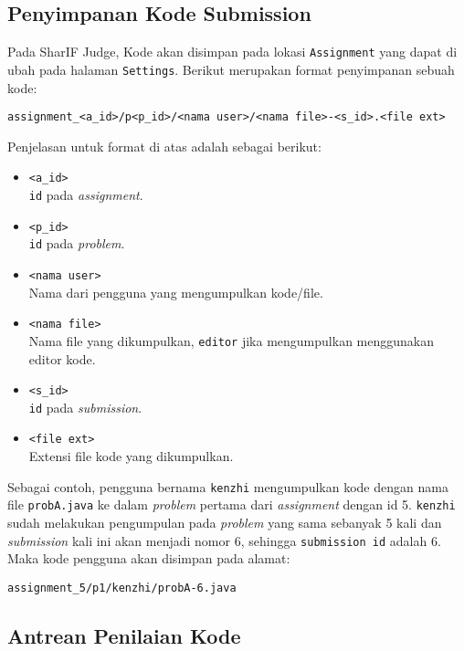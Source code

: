 \subsection{Penyimpanan Kode Submission}
\label{sub:3:1:penyimpanankode}
Pada SharIF Judge, Kode akan disimpan pada lokasi \verb|Assignment| yang dapat di ubah pada halaman \verb|Settings|. Berikut merupakan format penyimpanan sebuah kode:

\begin{center}
	\verb|assignment_<a_id>/p<p_id>/<nama user>/<nama file>-<s_id>.<file ext>|
\end{center}

Penjelasan untuk format di atas adalah sebagai berikut:

\begin{itemize}
	\item \verb|<a_id>| \\
	      \verb|id| pada \textit{assignment}.
	\item \verb|<p_id>| \\
	      \verb|id| pada \textit{problem}.
	\item \verb|<nama user>| \\
	      Nama dari pengguna yang mengumpulkan kode/file.
	\item \verb|<nama file>| \\
	      Nama file yang dikumpulkan, \verb|editor| jika mengumpulkan menggunakan editor kode.
	\item \verb|<s_id>| \\
	      \verb|id| pada \textit{submission}.
	\item \verb|<file ext>| \\
	      Extensi file kode yang dikumpulkan.
\end{itemize}

Sebagai contoh, pengguna bernama \verb|kenzhi| mengumpulkan kode dengan nama file \verb|probA.java| ke dalam \textit{problem} pertama dari \textit{assignment} dengan id 5. \verb|kenzhi| sudah melakukan pengumpulan pada \textit{problem} yang sama sebanyak 5 kali dan \textit{submission} kali ini akan menjadi nomor 6, sehingga \verb|submission id| adalah 6. Maka kode pengguna akan disimpan pada alamat:

\begin{center}
	\verb|assignment_5/p1/kenzhi/probA-6.java|
\end{center}

\subsection{Antrean Penilaian Kode}
\label{sub:3:1:antreanpenilaiankode}

